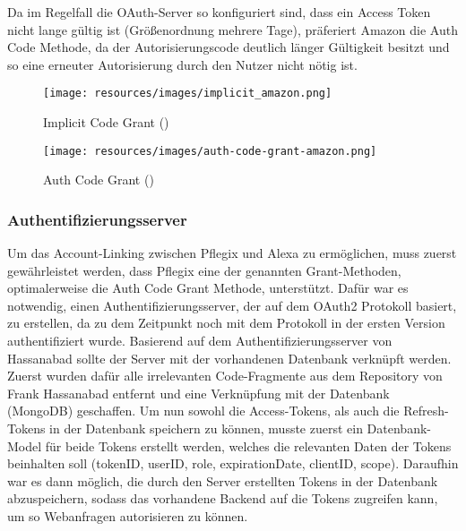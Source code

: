 Da im Regelfall die OAuth-Server so konfiguriert sind, dass ein Access Token nicht lange gültig ist (Größenordnung mehrere Tage), präferiert Amazon die Auth Code Methode, da der Autorisierungscode deutlich länger Gültigkeit besitzt und so eine erneuter Autorisierung durch den Nutzer nicht nötig ist.
\begin{figure} [H]
    \texttt{[image: resources/images/implicit\_amazon.png]}
    \caption{Implicit Code Grant (\citealp{Amazon.com2018})}
    \label{fig:implicit}
\end{figure}

\begin{figure} [H]
    \texttt{[image: resources/images/auth-code-grant-amazon.png]}
    \caption{Auth Code Grant (\citealp{Amazon.com2018})}
    \label{fig:authcode}
\end{figure}

\subsubsection{Authentifizierungsserver}\label{sssec:authserver}
Um das Account-Linking zwischen Pflegix und Alexa zu ermöglichen, muss zuerst gewährleistet werden, dass Pflegix eine der genannten Grant-Methoden, optimalerweise die Auth Code Grant Methode, unterstützt. Dafür war es notwendig, einen Authentifizierungsserver, der auf dem OAuth2 Protokoll basiert, zu erstellen, da zu dem Zeitpunkt noch mit dem Protokoll in der ersten Version authentifiziert wurde.
Basierend auf dem Authentifizierungsserver von Hassanabad \citeyear{Hassanabad2018} sollte der Server mit der vorhandenen Datenbank verknüpft werden. Zuerst wurden dafür alle irrelevanten Code-Fragmente aus dem Repository von Frank Hassanabad entfernt und eine Verknüpfung mit der Datenbank (MongoDB) geschaffen. Um nun sowohl die Access-Tokens, als auch die Refresh-Tokens in der Datenbank speichern zu können, musste zuerst ein Datenbank-Model für beide Tokens erstellt werden, welches die relevanten Daten der Tokens beinhalten soll (tokenID, userID, role, expirationDate, clientID, scope). Daraufhin war es dann möglich, die durch den Server erstellten Tokens in der Datenbank abzuspeichern, sodass das vorhandene Backend auf die Tokens zugreifen kann, um so Webanfragen autorisieren zu können.

